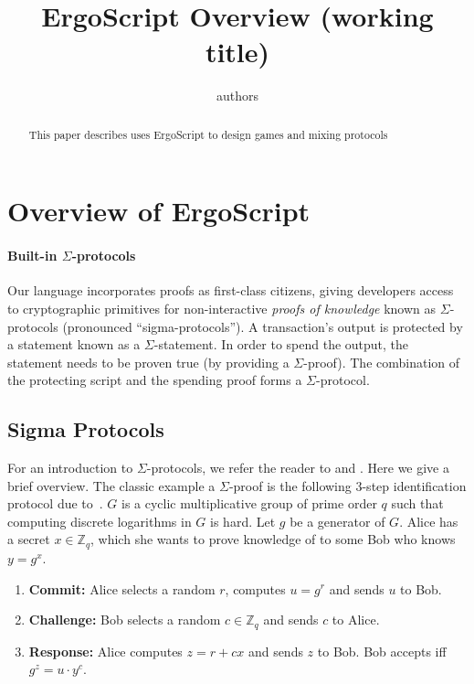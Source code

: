 \documentclass[11pt]{article}
\newcommand{\langname}{ErgoScript\xspace}
\begin{document}
\title{\langname Overview (working title)}

\author{authors}


\maketitle


\begin{abstract}
This paper describes uses \langname to design games and mixing protocols
\end{abstract}
\section{Overview of \langname}

\paragraph{Built-in $\Sigma$-protocols}
Our language incorporates proofs as first-class citizens, giving developers access to cryptographic primitives for non-interactive {\em proofs of knowledge} known as $\Sigma$-protocols (pronounced ``sigma-protocols''). A transaction's output is protected by a statement known as a $\Sigma$-statement. In order to spend the output, the statement needs to be proven true (by providing a $\Sigma$-proof). The combination of the protecting script and the spending proof forms a $\Sigma$-protocol.

\subsection{Sigma Protocols}
For an introduction to $\Sigma$-protocols, we refer the reader to \cite{Dam10} and \cite[Chapter 6]{HL10}. Here we give a brief overview. The classic example a $\Sigma$-proof is the following 3-step identification protocol due to~\cite{Sch91}. $G$ is a cyclic multiplicative group of prime order $q$ such that computing discrete logarithms in $G$ is hard. Let $g$ be a generator of $G$. Alice has a secret $x \in \mathbb{Z}_q$, which she wants to prove knowledge of to some Bob who knows $y = g^x$.
\begin{enumerate}
	\item \textbf{Commit:} Alice selects a random $r$, computes $u = g^r$ and sends $u$ to Bob.
	\item \textbf{Challenge:} Bob selects a random $c\in\mathbb{Z}_q$ and sends $c$ to Alice.
	\item \textbf{Response:} Alice computes $z = r + cx$ and sends $z$ to Bob. Bob accepts iff $g^z = u\cdot y^c$.
\end{enumerate}
\end{document}
